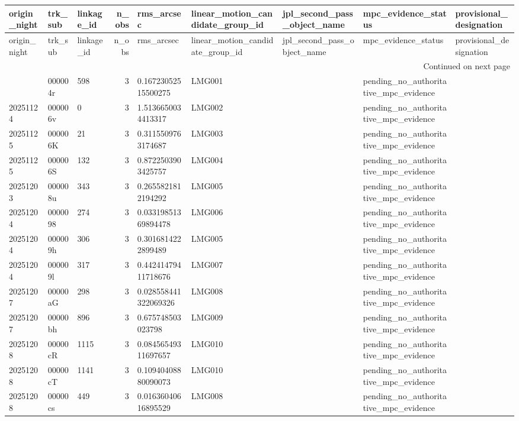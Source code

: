 \begin{longtable}{lllrlllll}
\toprule
origin\_night & trk\_sub & linkage\_id & n\_obs & rms\_arcsec & linear\_motion\_candidate\_group\_id & jpl\_second\_pass\_object\_name & mpc\_evidence\_status & provisional\_designation \\
\midrule
\endfirsthead
\toprule
origin\_night & trk\_sub & linkage\_id & n\_obs & rms\_arcsec & linear\_motion\_candidate\_group\_id & jpl\_second\_pass\_object\_name & mpc\_evidence\_status & provisional\_designation \\
\midrule
\endhead
\midrule
\multicolumn{9}{r}{Continued on next page} \\
\midrule
\endfoot
\bottomrule
\endlastfoot
20251121 & 000004r & 598 & 3 & 0.16723052515500275 & LMG001 &  & pending\_no\_authoritative\_mpc\_evidence &  \\
20251124 & 000006v & 0 & 3 & 1.5136650034413317 & LMG002 &  & pending\_no\_authoritative\_mpc\_evidence &  \\
20251125 & 000006K & 21 & 3 & 0.3115509763174687 & LMG003 &  & pending\_no\_authoritative\_mpc\_evidence &  \\
20251125 & 000006S & 132 & 3 & 0.8722503903425757 & LMG004 &  & pending\_no\_authoritative\_mpc\_evidence &  \\
20251203 & 000008u & 343 & 3 & 0.2655821812194292 & LMG005 &  & pending\_no\_authoritative\_mpc\_evidence &  \\
20251204 & 0000098 & 274 & 3 & 0.03319851369894478 & LMG006 &  & pending\_no\_authoritative\_mpc\_evidence &  \\
20251204 & 000009h & 306 & 3 & 0.3016814222899489 & LMG005 &  & pending\_no\_authoritative\_mpc\_evidence &  \\
20251204 & 000009l & 317 & 3 & 0.44241479411718676 & LMG007 &  & pending\_no\_authoritative\_mpc\_evidence &  \\
20251207 & 00000aG & 298 & 3 & 0.028558441322069326 & LMG008 &  & pending\_no\_authoritative\_mpc\_evidence &  \\
20251207 & 00000bh & 896 & 3 & 0.675748503023798 & LMG009 &  & pending\_no\_authoritative\_mpc\_evidence &  \\
20251208 & 00000cR & 1115 & 3 & 0.08456549311697657 & LMG010 &  & pending\_no\_authoritative\_mpc\_evidence &  \\
20251208 & 00000cT & 1141 & 3 & 0.10940408880090073 & LMG010 &  & pending\_no\_authoritative\_mpc\_evidence &  \\
20251208 & 00000cs & 449 & 3 & 0.01636040616895529 & LMG008 &  & pending\_no\_authoritative\_mpc\_evidence &  \\

\end{longtable}
